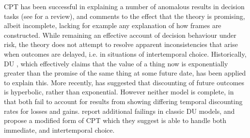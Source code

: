 \ac{CPT} has been successful in explaining a number of anomalous results in decision tasks (see \citet{Camerer2004a} for a review), and \citet{Thaler2000} comments to the effect that the theory is promising, albeit incomplete, lacking for example any explanation of how frames are constructed. While remaining an effective account of decision behaviour under risk, the theory does not attempt to resolve apparent inconsistencies that arise when outcomes are delayed, i.e. in situations of intertemporal choice. Historically, \ac{DU} \citep{Samuelson1937}, which effectively claims that the value of a thing now is exponentially greater than the promise of the same thing at some future date, has been applied to explain this. More recently, \citet{Ainslie1991} has suggested that discounting of future outcomes is hyperbolic, rather than exponential. However neither model is complete, in that both fail to account for results from \citet{Thaler1981} showing differing temporal discounting rates for losses and gains. \citet{Loewenstein1992} report additional failings in classic \ac{DU} models, and propose a modified form of \ac{CPT} which they suggest is able to handle both immediate, and intertemporal choice.